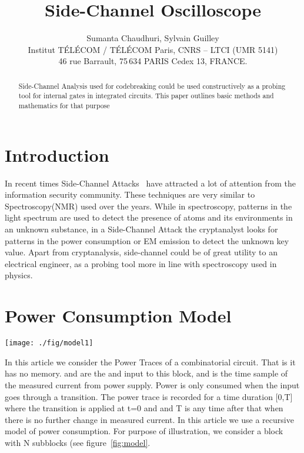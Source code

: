 \documentclass[a4]{IEEEtran}
\begin{document}
\title{Side-Channel Oscilloscope}
\author{Sumanta Chaudhuri, Sylvain Guilley \\
Institut T\'EL\'ECOM / T\'EL\'ECOM Paris, CNRS -- LTCI (UMR 5141)\\
46 rue Barrault, 75\,634 PARIS Cedex 13, FRANCE. \\
}


\maketitle
\begin{abstract}
Side-Channel Analysis used for codebreaking could be used constructively as a probing
tool for internal gates in integrated circuits. This paper outlines basic methods
and mathematics for that purpose
\end{abstract}

\section{Introduction}
\label{sec:intro}
In recent times Side-Channel Attacks~\cite{kocher-dpa_and_related_attacks} have attracted a lot of attention from the information 
security community. These techniques are very similar to Spectroscopy(NMR) used over the years.
While in spectroscopy, patterns in the light spectrum are used to detect the presence of atoms and its environments
in an unknown substance, in a Side-Channel Attack the cryptanalyst looks for patterns in the power consumption or EM 
emission to detect the unknown key value. Apart from cryptanalysis, side-channel could be of great utility to an electrical 
engineer, as a probing tool more in line with spectroscopy used in physics. 
\section{Power Consumption Model}
\begin{figure*}
\centering
\texttt{[image: ./fig/model1]}
\caption{Power Consumption Model.}
\label{fig:model}
\end{figure*}
In this article we consider the Power Traces  of a combinatorial circuit. That is it has no memory. 
 and  are the  and  input to this block, and  is the time sample of the measured 
current from power supply. Power is only consumed when the input goes through a transition. The power trace is recorded 
for a time duration [0,T] where the transition is applied at t=0 and and T is any time after that when there is no further 
change in  measured current. 
In this article we use a recursive model of power consumption. For purpose of illustration, we consider a block with N subblocks (see figure~\ref{fig:model}. 
\end{document}
